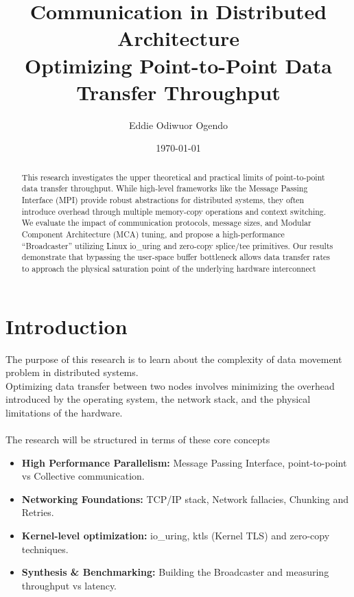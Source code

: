 \documentclass[11pt,a4paper]{article}
\title{Communication in Distributed Architecture \\ \large Optimizing Point-to-Point Data Transfer Throughput}
\author{Eddie Odiwuor Ogendo}
\date{\today}
\begin{document}
	
	\maketitle
	
	\begin{abstract}
		This research investigates the upper theoretical and practical limits of point-to-point data transfer throughput. While high-level frameworks like the Message Passing Interface (MPI) provide robust abstractions for distributed systems, they often introduce overhead through multiple memory-copy operations and context switching. We evaluate the impact of communication protocols, message sizes, and Modular Component Architecture (MCA) tuning, and propose a high-performance ``Broadcaster'' utilizing Linux io\_uring and zero-copy splice/tee primitives. Our results demonstrate that bypassing the user-space buffer bottleneck allows data transfer rates to approach the physical saturation point of the underlying hardware interconnect
	\end{abstract}
	
	\tableofcontents
	
	\newpage
	
	\section{Introduction}
	\label{sec:intro}
	The purpose of this research is to learn about the complexity of  data movement problem in distributed systems. 
	\\Optimizing data transfer between two nodes involves minimizing the overhead introduced by the operating system, the network stack, and the physical limitations of the hardware.
	\\\\The research will be structured in terms of these core concepts
	
	\begin{itemize} 
		\item \textbf{High Performance Parallelism:} Message Passing Interface, point-to-point vs Collective communication.
		
		\item \textbf{Networking Foundations:} TCP/IP stack, Network fallacies, Chunking and Retries.
		
		\item \textbf{Kernel-level optimization:} io\_uring, ktls (Kernel TLS) and zero-copy techniques.
		
		\item \textbf{Synthesis \& Benchmarking:} Building the Broadcaster and measuring throughput vs latency.
	\end{itemize}
	
\end{document}
